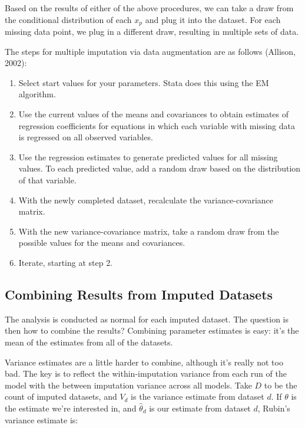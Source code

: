 \documentclass[12 pt]{article}
\begin{document}
Based on the results of either of the above procedures, we can take a draw from the
conditional distribution of each $x_p$ and plug it into the
dataset. For each missing data point, we plug in a different draw,
resulting in multiple sets of data. 


The steps for multiple imputation via data augmentation are as
follows (Allison, 2002):

\begin{enumerate}
\item Select start values for your parameters. Stata does this using
  the EM algorithm. 

\item Use the current values of the means and covariances to obtain
  estimates of regression coefficients for equations in which each
  variable with missing data is regressed on all observed variables. 

\item Use the regression estimates to generate predicted values for
  all missing values. To each predicted value, add a random draw based
  on the distribution of that variable.

\item With the newly completed dataset, recalculate the
  variance-covariance matrix. 

\item With the new variance-covariance matrix, take a random draw from
  the possible values for the means and covariances.

\item Iterate, starting at step 2. 
\end{enumerate}



\subsection{Combining Results from Imputed Datasets}

The analysis is conducted as normal for each imputed dataset. The
question is then how to combine the results? Combining parameter
estimates is easy: it's the mean of the estimates from all of the
datasets.

Variance estimates are a little harder to combine, although it's
really not too bad. The key is to reflect the within-imputation
variance from each run of the model with the between imputation
variance across all models. Take $D$ to be the count of imputed
datasets, and $V_d$ is the variance estimate from dataset $d$. If $\theta$ is the estimate we're
interested in, and $\hat{\theta}_d$ is our estimate from dataset $d$, Rubin's
variance estimate is: 
\end{document}
